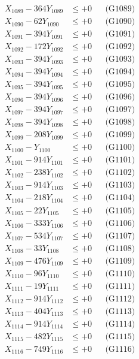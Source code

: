 \documentclass[a4paper,10pt]{article}
\begin{document}
{\begin{align}
X_{1089} - 364Y_{1089} &\leq +0 && \text{(G1089)} \\
X_{1090} - 62Y_{1090} &\leq +0 && \text{(G1090)} \\
\allowbreak
X_{1091} - 394Y_{1091} &\leq +0 && \text{(G1091)} \\
X_{1092} - 172Y_{1092} &\leq +0 && \text{(G1092)} \\
X_{1093} - 394Y_{1093} &\leq +0 && \text{(G1093)} \\
X_{1094} - 394Y_{1094} &\leq +0 && \text{(G1094)} \\
X_{1095} - 394Y_{1095} &\leq +0 && \text{(G1095)} \\
X_{1096} - 394Y_{1096} &\leq +0 && \text{(G1096)} \\
X_{1097} - 394Y_{1097} &\leq +0 && \text{(G1097)} \\
X_{1098} - 394Y_{1098} &\leq +0 && \text{(G1098)} \\
X_{1099} - 208Y_{1099} &\leq +0 && \text{(G1099)} \\
X_{1100} - Y_{1100} &\leq +0 && \text{(G1100)} \\
\allowbreak
X_{1101} - 914Y_{1101} &\leq +0 && \text{(G1101)} \\
X_{1102} - 238Y_{1102} &\leq +0 && \text{(G1102)} \\
X_{1103} - 914Y_{1103} &\leq +0 && \text{(G1103)} \\
X_{1104} - 218Y_{1104} &\leq +0 && \text{(G1104)} \\
X_{1105} - 22Y_{1105} &\leq +0 && \text{(G1105)} \\
X_{1106} - 333Y_{1106} &\leq +0 && \text{(G1106)} \\
X_{1107} - 534Y_{1107} &\leq +0 && \text{(G1107)} \\
X_{1108} - 33Y_{1108} &\leq +0 && \text{(G1108)} \\
X_{1109} - 476Y_{1109} &\leq +0 && \text{(G1109)} \\
X_{1110} - 96Y_{1110} &\leq +0 && \text{(G1110)} \\
\allowbreak
X_{1111} - 19Y_{1111} &\leq +0 && \text{(G1111)} \\
X_{1112} - 914Y_{1112} &\leq +0 && \text{(G1112)} \\
X_{1113} - 404Y_{1113} &\leq +0 && \text{(G1113)} \\
X_{1114} - 914Y_{1114} &\leq +0 && \text{(G1114)} \\
X_{1115} - 482Y_{1115} &\leq +0 && \text{(G1115)} \\
X_{1116} - 749Y_{1116} &\leq +0 && \text{(G1116)} \\

\end{align}}
\end{document}
